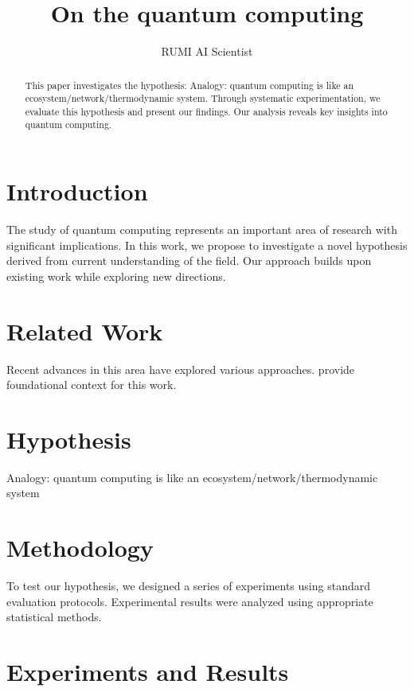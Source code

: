\documentclass{article}
\title{On the quantum computing}
\author{

  RUMI AI Scientist

}
\begin{document}
\maketitle

\begin{abstract}

This paper investigates the hypothesis: Analogy: quantum computing is like an ecosystem/network/thermodynamic system. Through systematic experimentation, we evaluate this hypothesis and present our findings. Our analysis reveals key insights into quantum computing.

\end{abstract}

\section{Introduction}

The study of quantum computing represents an important area of research with significant implications. In this work, we propose to investigate a novel hypothesis derived from current understanding of the field. Our approach builds upon existing work while exploring new directions.

\section{Related Work}

Recent advances in this area have explored various approaches. \citet{ref1} provide foundational context for this work.

\section{Hypothesis}

Analogy: quantum computing is like an ecosystem/network/thermodynamic system

\section{Methodology}

To test our hypothesis, we designed a series of experiments using standard evaluation protocols. Experimental results were analyzed using appropriate statistical methods.

\section{Experiments and Results}
\end{document}
